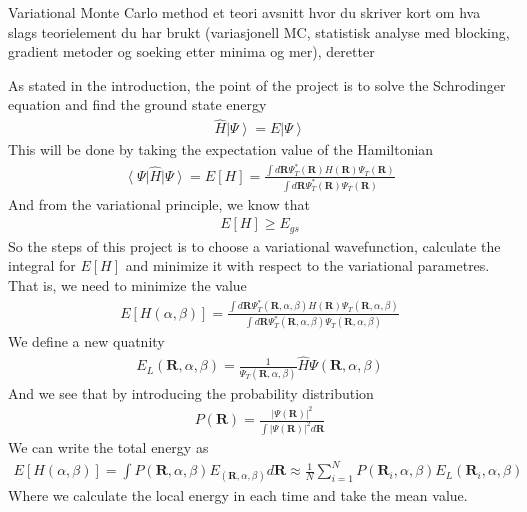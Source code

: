 \documentclass[a4paper, 12pt, titlepage]{article}
\begin{document}
\begin{section}{Variational Monte Carlo method}
   et teori avsnitt hvor du skriver kort om hva slags teorielement du har brukt (variasjonell MC, statistisk analyse med blocking, gradient metoder og soeking etter minima og mer), deretter

   As stated in the introduction, the point of the project is to solve the Schrodinger equation and find the ground state energy
   \begin{align}
   	\hat H \left| \Psi \right> = E \left|\Psi \right> 
   \end{align}
   This will be done by taking the expectation value of the Hamiltonian
   \begin{align}
   	\left< \Psi \right| \hat H \left| \Psi \right> = E[H] = \frac{\int d \mathbf{R} \Psi^*_T(\mathbf{R}) H(\mathbf{R}) \Psi_T(\mathbf{R})}{ \int d \mathbf{R} \Psi^*_T(\mathbf{R}) \Psi_T(\mathbf{R})}
   \end{align}
 	And from the variational principle, we know that 
 	\begin{align}
 		E[H] \geq E_{gs}
 	\end{align}
 	So the steps of this project is to choose a variational wavefunction, calculate the integral for $E[H]$ and minimize it with respect to the variational parametres. That is, we need to minimize the value
 	\begin{align}
 		E[H(\alpha, \beta)] = \frac{\int d \mathbf{R} \Psi^*_T(\mathbf{R},\alpha,\beta) H(\mathbf{R}) \Psi_T(\mathbf{R},\alpha,\beta)}{ \int d \mathbf{R} \Psi^*_T(\mathbf{R},\alpha,\beta) \Psi_T(\mathbf{R},\alpha,\beta)}
 	\end{align}
 	We define a new quatnity 
 	\begin{align}
 		E_L({\mathbf{R},\alpha,\beta}) = \frac{1}{\Psi_T(\mathbf{R},\alpha,\beta)} \hat H \Psi(\mathbf{R},\alpha,\beta)
 	\end{align}
 	And we see that by introducing the probability distribution
 	\begin{align}
 		P(\mathbf{R}) = \frac{|\Psi(\mathbf{R})|^2}{\int|\Psi(\mathbf{R})|^2 d \mathbf{R}}
 	\end{align}
 	We can write the total energy as
 	\begin{align}
 		E[H(\alpha,\beta)] = \int P(\mathbf{R},\alpha,\beta) E_(\mathbf{R},\alpha,\beta) d \mathbf{R} \approx \frac{1}{N} \sum_{i=1}^N P(\mathbf{R}_i,\alpha,\beta) E_L(\mathbf{R}_i,\alpha,\beta)
 	\end{align}
 	Where we calculate the local energy in each time and take the mean value. 


\end{section}
\end{document}
